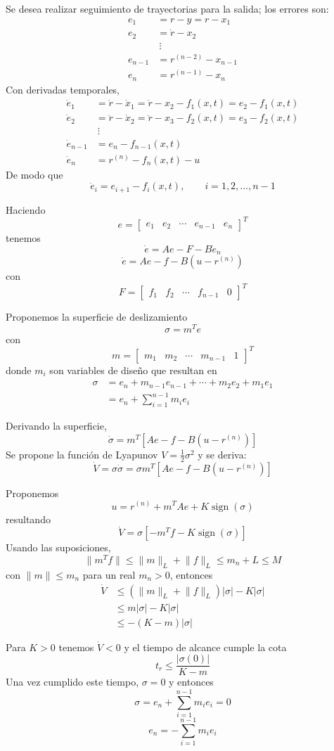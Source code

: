 Se desea realizar seguimiento de trayectorias para la salida; los errores son:
\begin{align*}
  e_1 &= r-y=r-x_1\\
  e_2 &= \dot{r}-x_2\\
  &\ \vdots\\
  e_{n-1} &= r^{(n-2)}-x_{n-1}\\
  e_n &= r^{(n-1)}-x_n
\end{align*}
Con derivadas temporales,
\begin{align*}
  \dot{e}_1
    &=\dot{r}-\dot{x}_1
     =\dot{r}-x_2-f_1(x,t)
     =e_2-f_1(x,t)\\
  \dot{e}_2
    &=\ddot{r}-\dot{x}_2
     =\ddot{r}-x_3-f_2(x,t)
     =e_3-f_2(x,t)\\
  &\ \vdots\\
  \dot{e}_{n-1} &=e_n-f_{n-1}(x,t)\\
  \dot{e}_n
    &=r^{(n)}-f_n(x,t)-u
\end{align*}
De modo que
\[
  \dot{e}_i=e_{i+1}-f_i(x,t),
  \qquad i=1,2,\ldots,n-1
\]

Haciendo
\[
  e=\begin{bmatrix}e_1 & e_2 & \cdots & e_{n-1} & e_n\end{bmatrix}^{T}
\]
tenemos
\[
  \dot{e}=Ae-F-B\dot{e}_n
\]
\[
  \dot{e}=Ae-f-B\left(u-r^{(n)}\right)
\]
con
\[
  F=\begin{bmatrix}f_1 & f_2 & \cdots & f_{n-1} & 0\end{bmatrix}^{T}
\]

Proponemos la superficie de deslizamiento
\[
  \sigma=m^{T}e
\]
con
\[
  m=\begin{bmatrix}m_1 & m_2 & \cdots & m_{n-1} & 1\end{bmatrix}^{T}
\]
donde $m_i$ son variables de diseño que resultan en
\begin{align*}
  \sigma
    &=e_n+m_{n-1}e_{n-1}+\cdots+m_2e_2+m_1e_1\\
    &=e_n+\sum_{i=1}^{n-1}m_i e_i
\end{align*}

Derivando la superficie,
\[
  \dot{\sigma}=m^{T}\left[Ae-f-B\left(u-r^{(n)}\right)\right]
\]
Se propone la función de Lyapunov $V=\frac{1}{2}\sigma^2$ y se deriva:
\[
  \dot{V}=\sigma\dot{\sigma}
  =\sigma m^{T}\left[Ae-f-B\left(u-r^{(n)}\right)\right]
\]

Proponemos
\[
  u=r^{(n)}+m^{T}Ae+K\operatorname{sign}(\sigma)
\]
resultando
\[
  \dot{V}=\sigma\left[-m^{T}f-K\operatorname{sign}(\sigma)\right]
\]
Usando las suposiciones,
\[
  \lVert m^{T}f\rVert
  \leq\lVert m\rVert_L+\lVert f\rVert_L
  \leq m_n+L\leq M
\]
con $\lVert m\rVert\leq m_n$ para un real $m_n>0$, entonces
\begin{align*}
  \dot{V}
    &\leq\left(\lVert m\rVert_L+\lVert f\rVert_L\right)
      \lvert\sigma\rvert-K\lvert\sigma\rvert\\
    &\leq m\lvert\sigma\rvert-K\lvert\sigma\rvert\\
    &\leq-(K-m)\lvert\sigma\rvert
\end{align*}

Para $K>0$ tenemos $\dot{V}<0$ y el tiempo de alcance cumple la cota
\[
  t_r\leq\frac{\lvert\sigma(0)\rvert}{K-m}
\]
Una vez cumplido este tiempo, $\sigma=0$ y entonces
\[
  \sigma=e_n+\sum_{i=1}^{n-1}m_i e_i=0
\]
\[
  e_n=-\sum_{i=1}^{n-1}m_i e_i
\]